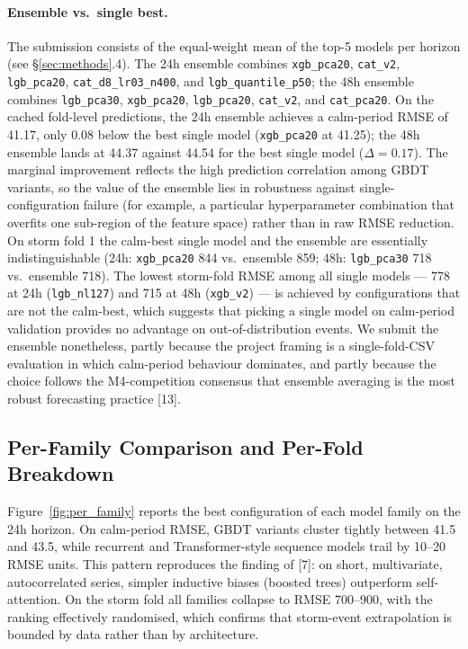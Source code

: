 \documentclass[11pt]{article}
\begin{document}



\paragraph{Ensemble vs.\ single best.}
The submission consists of the equal-weight mean of the top-5 models
per horizon (see \S\ref{sec:methods}.4). The 24h ensemble combines
\texttt{xgb\_pca20}, \texttt{cat\_v2}, \texttt{lgb\_pca20},
\texttt{cat\_d8\_lr03\_n400}, and \texttt{lgb\_quantile\_p50}; the 48h
ensemble combines \texttt{lgb\_pca30}, \texttt{xgb\_pca20},
\texttt{lgb\_pca20}, \texttt{cat\_v2}, and \texttt{cat\_pca20}. On the
cached fold-level predictions, the 24h ensemble achieves a calm-period
RMSE of 41.17, only 0.08 below the best single model (\texttt{xgb\_pca20}
at 41.25); the 48h ensemble lands at 44.37 against 44.54 for the best
single model ($\Delta\!=\!0.17$). The marginal improvement reflects the
high prediction correlation among GBDT variants, so the value of the
ensemble lies in robustness against single-configuration failure (for
example, a particular hyperparameter combination that overfits one
sub-region of the feature space) rather than in raw RMSE reduction. On
storm fold 1 the calm-best single model and the ensemble are
essentially indistinguishable (24h: \texttt{xgb\_pca20} 844 vs.\
ensemble 859; 48h: \texttt{lgb\_pca30} 718 vs.\ ensemble 718). The
lowest storm-fold RMSE among all single models --- 778 at 24h
(\texttt{lgb\_nl127}) and 715 at 48h (\texttt{xgb\_v2}) --- is achieved
by configurations that are not the calm-best, which suggests that
picking a single model on calm-period validation provides no advantage
on out-of-distribution events. We submit the ensemble nonetheless,
partly because the project framing is a single-fold-CSV evaluation in
which calm-period behaviour dominates, and partly because the choice
follows the M4-competition consensus that ensemble averaging is the
most robust forecasting practice [13].

\subsection{Per-Family Comparison and Per-Fold Breakdown}
Figure~\ref{fig:per_family} reports the best configuration of each
model family on the 24h horizon. On calm-period RMSE, GBDT variants
cluster tightly between 41.5 and 43.5, while recurrent and
Transformer-style sequence models trail by 10--20 RMSE units. This
pattern reproduces the finding of [7]: on short, multivariate,
autocorrelated series, simpler inductive biases (boosted trees)
outperform self-attention. On the storm fold all families collapse to
RMSE 700--900, with the ranking effectively randomised, which confirms
that storm-event extrapolation is bounded by data rather than by
architecture.
\end{document}

